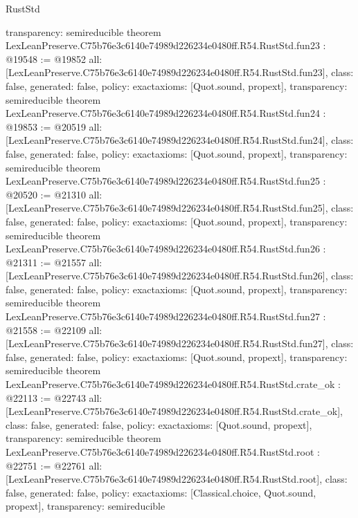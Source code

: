 \begin{lexlean}{RustStd}
\begin{coremodule}
{  transparency: semireducible
}
theorem LexLeanPreserve.C75b76e3c6140e74989d226234e0480ff.R54.RustStd.fun23 : @19548 := @19852 {
  all: [LexLeanPreserve.C75b76e3c6140e74989d226234e0480ff.R54.RustStd.fun23],
  class: false,
  generated: false,
  policy: exact{axioms: [Quot.sound, propext]},
  transparency: semireducible
}
theorem LexLeanPreserve.C75b76e3c6140e74989d226234e0480ff.R54.RustStd.fun24 : @19853 := @20519 {
  all: [LexLeanPreserve.C75b76e3c6140e74989d226234e0480ff.R54.RustStd.fun24],
  class: false,
  generated: false,
  policy: exact{axioms: [Quot.sound, propext]},
  transparency: semireducible
}
theorem LexLeanPreserve.C75b76e3c6140e74989d226234e0480ff.R54.RustStd.fun25 : @20520 := @21310 {
  all: [LexLeanPreserve.C75b76e3c6140e74989d226234e0480ff.R54.RustStd.fun25],
  class: false,
  generated: false,
  policy: exact{axioms: [Quot.sound, propext]},
  transparency: semireducible
}
theorem LexLeanPreserve.C75b76e3c6140e74989d226234e0480ff.R54.RustStd.fun26 : @21311 := @21557 {
  all: [LexLeanPreserve.C75b76e3c6140e74989d226234e0480ff.R54.RustStd.fun26],
  class: false,
  generated: false,
  policy: exact{axioms: [Quot.sound, propext]},
  transparency: semireducible
}
theorem LexLeanPreserve.C75b76e3c6140e74989d226234e0480ff.R54.RustStd.fun27 : @21558 := @22109 {
  all: [LexLeanPreserve.C75b76e3c6140e74989d226234e0480ff.R54.RustStd.fun27],
  class: false,
  generated: false,
  policy: exact{axioms: [Quot.sound, propext]},
  transparency: semireducible
}
theorem LexLeanPreserve.C75b76e3c6140e74989d226234e0480ff.R54.RustStd.crate_ok : @22113 := @22743 {
  all: [LexLeanPreserve.C75b76e3c6140e74989d226234e0480ff.R54.RustStd.crate_ok],
  class: false,
  generated: false,
  policy: exact{axioms: [Quot.sound, propext]},
  transparency: semireducible
}
theorem LexLeanPreserve.C75b76e3c6140e74989d226234e0480ff.R54.RustStd.root : @22751 := @22761 {
  all: [LexLeanPreserve.C75b76e3c6140e74989d226234e0480ff.R54.RustStd.root],
  class: false,
  generated: false,
  policy: exact{axioms: [Classical.choice, Quot.sound, propext]},
  transparency: semireducible
}


\end{coremodule}
\end{lexlean}
